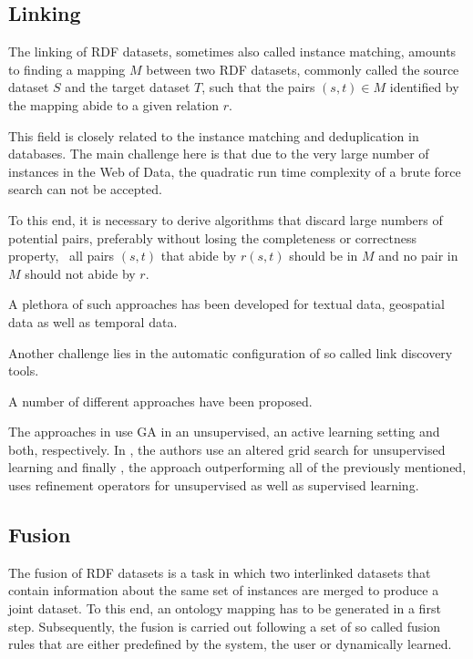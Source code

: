 \subsection{Linking}
\label{ssec:linking}

The linking of \ac{RDF} datasets, sometimes also called instance matching, amounts to finding a mapping $M$ between two \ac{RDF} datasets, commonly called the source dataset $S$ and the target dataset $T$, such that the pairs $(s,t)\in M$ identified by the mapping abide to a given relation $r$.

This field is closely related to the instance matching and deduplication in databases.
The main challenge here is that due to the very large number of instances in the Web of Data, the quadratic run time complexity of a brute force search can not be accepted.

To this end, it is necessary to derive algorithms that discard large numbers of potential pairs, preferably without losing the completeness or correctness property, \ie~all pairs $(s,t)$ that abide by $r(s,t)$ should be in $M$ and no pair in $M$ should not abide by $r$.

A plethora of such approaches has been developed for textual data\cite{drng14,xiao:p2008a,xiao:tds2011a,feng:vj2012a,isele:2011a,karakasidis:2012a}, geospatial data\cite{radon_2017, du:2013a,shivaprabhu:2017a} as well as temporal data\cite{allenalgebra}.

Another challenge lies in the automatic configuration of so called link discovery tools.

A number of different approaches have been proposed.

The approaches in \cite{NGLY12,NGO+13b,isele:2013a} use \acl{GA} in an unsupervised, an active learning setting and both, respectively.
In \cite{NGLY13}, the authors use an altered grid search for unsupervised learning and finally \cite{sherif:2017a}, the approach outperforming all of the previously mentioned, uses refinement operators for unsupervised as well as supervised learning.

\subsection{Fusion}
\label{ssec:fusion}

The fusion of \ac{RDF} datasets is a task in which two interlinked datasets that contain information about the same set of instances are merged to produce a joint dataset.
To this end, an ontology mapping has to be generated in a first step.
Subsequently, the fusion is carried out following a set of so called fusion rules that are either predefined by the system, the user or dynamically learned.

